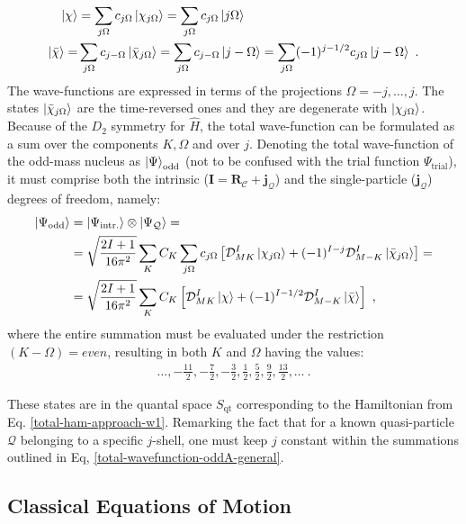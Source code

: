 \begin{align}
    \ket{\chi}&=\sum_{j\Omega}c_{j\Omega}\ket{\chi_{j\Omega}}=\sum_{j\Omega}c_{j\Omega}\ket{j\Omega}\nonumber\\
    \ket{\bar{\chi}}=&\sum_{j\Omega}c_{j-\Omega}\ket{\bar{\chi}_{j\Omega}}=\sum_{j\Omega}c_{j-\Omega}\ket{j-\Omega}=\sum_{j\Omega}(-1)^{j-1/2}c_{j\Omega}\ket{j-\Omega}\ .
    \label{j-Omega-single-particle-states}
\end{align}
The wave-functions are expressed in terms of the projections $\Omega=-j,\dots,j$. The states $\ket{\bar{\chi}_{j\Omega}}$ are the time-reversed ones and they are degenerate with $\ket{\chi_{j\Omega}}$. Because of the $D_2$ symmetry for $\hat{H}$, the total wave-function can be formulated as a sum over the components $K, \Omega$ and over $j$. Denoting the total wave-function of the odd-mass nucleus as $\ket{\Psi}_\text{odd}$ (not to be confused with the trial function $\Psi_\text{trial}$), it must comprise both the intrinsic ($\mathbf{I}=\mathbf{R}_\mathscr{C}+\mathbf{j}_\mathcal{Q}$) and the single-particle ($\mathbf{j}_\mathcal{Q}$) degrees of freedom, namely:
\begin{align}
    \ket{\Psi_\text{odd}}&=\ket{\Psi_\text{intr.}}\otimes\ket{\Psi_\mathcal{Q}}=\nonumber\\
    &=\sqrt{\frac{2I+1}{16\pi^2}}\sum_K C_K\sum_{j\Omega}c_{j\Omega}\left[\mathcal{D}_{MK}^I\ket{\chi_{j\Omega}}+(-1)^{I-j}\mathcal{D}_{M-K}^I\ket{\bar{\chi}_{j\Omega}}\right]=\nonumber\\
    &=\sqrt{\frac{2I+1}{16\pi^2}}\sum_K C_K \left[\mathcal{D}_{MK}^I\ket{\chi}+(-1)^{I-1/2}\mathcal{D}_{M-K}^I\ket{\bar{\chi}}\right]\ ,
    \label{total-wavefunction-oddA-general}
\end{align}
where the entire summation must be evaluated under the restriction $(K-\Omega)=even$, resulting in both $K$ and $\Omega$ having the values:
\begin{align}
    \dots,-\frac{11}{2},-\frac{7}{2},-\frac{3}{2},\frac{1}{2},\frac{5}{2},\frac{9}{2},\frac{13}{2},\dots\ .
\end{align}

These states are in the quantal space $S_\text{qt}$ corresponding to the Hamiltonian from Eq. \ref{total-ham-approach-w1}. Remarking the fact that for a known quasi-particle $\mathcal{Q}$ belonging to a specific $j$-shell, one must keep $j$ constant within the summations outlined in Eq, \ref{total-wavefunction-oddA-general}.

\subsection{Classical Equations of Motion}
\label{equations-of-motion-section}


